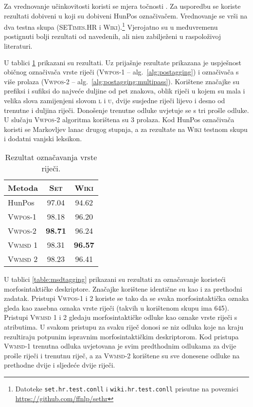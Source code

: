 Za vrednovanje učinkovitosti koristi se mjera točnosti . Za
usporedbu se koriste rezultati dobiveni u \citep{agic2013lemmatization} koji su
dobiveni HunPos označivačem. Vrednovanje se vrši na dva testna skupa
(\textsc{SETimes.HR} i \textsc{Wiki}).\footnote{Datoteke
\texttt{set.hr.test.conll} i \texttt{wiki.hr.test.conll} prisutne na poveznici
\url{https://github.com/ffnlp/sethr}} Vjerojatno su u međuvremenu postignuti
bolji rezultati od navedenih, ali nisu zabilježeni u raspoloživoj literaturi.

U tablici \ref{table:postagging} prikazani su rezultati. Uz prijašnje rezultate
prikazana je uspješnost običnog označivača vrste riječi (\textsc{Vwpos-1} --
alg.~\ref{alg:postagging}) i označivača s više prolaza (\textsc{Vwpos-2} --
alg.~\ref{alg:postagging:multipass}). Korištene značajke su prefiksi i sufiksi
do najveće duljine od pet znakova, oblik riječi u kojem su mala i velika slova
zamijenjeni slovom \textsc{l} i \textsc{u}, dvije susjedne riječi lijevo i desno
od trenutne i duljina riječi. Donošenje trenutne odluke uvjetuje se s tri prošle
odluke. U slučaju \textsc{Vwpos-2} algoritma korištena su 3 prolaza. Kod HunPos
označivača koristi se Markovljev lanac drugog stupnja, a za rezultate na
\textsc{Wiki} testnom skupu i dodatni vanjski leksikon.

\begin{table}
\centering
\caption[Rezultat označavanja vrste riječi.]{Rezultat označavanja vrste riječi.}
\label{table:postagging}
\begin{tabular}{|l|c|c|}
\hline
Metoda             & \textsc{Set}   & \textsc{Wiki}  \\ \hline \hline
HunPos             & 97.04          & 94.62          \\
\textsc{Vwpos-1}   & 98.18          & 96.20          \\
\textsc{Vwpos-2}   & \textbf{98.71} & 96.24          \\
\textsc{Vwmsd} 1   & 98.31          & \textbf{96.57} \\
\textsc{Vwmsd} 2   & 98.23          & 96.41          \\ \hline
\end{tabular}
\end{table}

U tablici \ref{table:msdtagging} prikazani su rezultati za označavanje koristeći
morfosintaktičke deskriptore. Značajke korištene identične su kao i za prethodni
zadatak. Pristupi \textsc{Vwpos-1} i \textsc{2} koriste se tako da se svaka
morfosintaktička oznaka gleda kao zasebna oznaka vrste riječi (takvih u
korištenom skupu ima 645). Pristupi \textsc{Vwmsd} 1 i 2 gledaju
morfosintaktičke odluke kao oznake vrste riječi s atributima. U svakom pristupu
za svaku riječ donosi se niz odluka koje na kraju rezultiraju potpunim ispravnim
morfosintaktičkim deskriptorom.  Kod pristupa \textsc{Vwmsd-1} trenutna odluka
uvjetovana je svim predthodnim odlukama za dvije prošle riječi i trenutnu riječ,
a za \textsc{Vwmsd-2} korištene su sve donesene odluke na prethodne dvije i
sljedeće dvije riječi.

